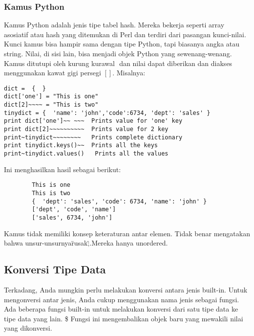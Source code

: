 \subsubsection{Kamus Python}
	Kamus Python adalah jenis tipe tabel hash. Mereka bekerja seperti array asosiatif atau hash yang ditemukan di Perl dan terdiri dari pasangan kunci-nilai. Kunci kamus bisa hampir sama dengan tipe Python, tapi biasanya angka atau string. Nilai, di sisi lain, bisa menjadi objek Python yang sewenang-wenang. 
Kamus ditutupi oleh kurung kurawal \({}\) dan nilai dapat diberikan dan diakses menggunakan kawat gigi persegi \([]\). 
Misalnya:
\begin{verbatim}
dict =  {  } 
dict['one'] = "This is one"
dict[2]~~~~ = "This is two" 
tinydict = {  'name': 'john','code':6734, 'dept': 'sales' }  
print dict['one']~~ ~~~  Prints value for 'one' key 
print dict[2]~~~~~~~~~~  Prints value for 2 key 
print~tinydict~~~~~~~~   Prints complete dictionary
print tinydict.keys()~~  Prints all the keys 
print~tinydict.values()   Prints all the values 
\end{verbatim}
Ini menghasilkan hasil sebagai berikut:
	\begin{verbatim}
		This is one 
		This is two 
		{  'dept': 'sales', 'code': 6734, 'name': 'john' } 
		['dept', 'code', 'name'] 
		['sales', 6734, 'john'] 
	\end{verbatim}
Kamus tidak memiliki konsep keteraturan antar elemen. Tidak benar mengatakan bahwa unsur-unsurnya\"rusak\";.Mereka hanya unordered. 
\subsection{Konversi Tipe Data}
Terkadang, Anda mungkin perlu melakukan konversi antara jenis built-in. Untuk mengonversi antar jenis, Anda cukup menggunakan nama jenis sebagai fungsi. 
Ada beberapa fungsi built-in untuk melakukan konversi dari satu tipe data ke tipe data yang lain. \$  Fungsi ini mengembalikan objek baru yang mewakili nilai yang dikonversi. 
